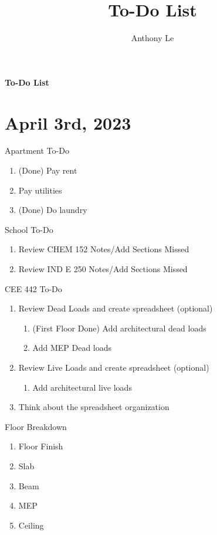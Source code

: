 \documentclass{report} %
\title{To-Do List}
\author{Anthony Le}
\begin{document}
\pagestyle{fancy}
\fancyhead{}
\fancyfoot[L]{\thepage}

\begin{center}
    \LARGE{\textbf{To-Do List}}
\end{center}
    
\section*{April 3rd, 2023}
Apartment To-Do
\begin{enumerate}
    \item (Done) Pay rent
    \item Pay utilities
    \item (Done) Do laundry
\end{enumerate}

\noindent
School To-Do
\begin{enumerate}
    \item Review CHEM 152 Notes/Add Sections Missed
    \item Review IND E 250 Notes/Add Sections Missed
\end{enumerate}

\noindent
CEE 442 To-Do
\begin{enumerate}
    \item Review Dead Loads and create spreadsheet (optional) %
    \begin{enumerate}
        \item (First Floor Done) Add architectural dead loads
        \item Add MEP Dead loads
    \end{enumerate}
    \item Review Live Loads and create spreadsheet (optional)
    \begin{enumerate}
        \item Add architectural live loads
    \end{enumerate}
    \item Think about the spreadsheet organization
\end{enumerate}

\noindent
Floor Breakdown
\begin{enumerate}
    \item Floor Finish
    \item Slab
    \item Beam
    \item MEP
    \item Ceiling
\end{enumerate}
\end{document}
